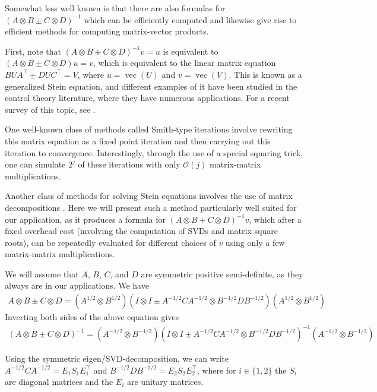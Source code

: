 \documentclass[12pt]{article}
\newcommand{\ovec}{\operatorname{vec}}
\newcommand{\bigO}{\mathcal{O}}
\begin{document}
Somewhat less well known is that there are also formulas for $(A \otimes B \pm C \otimes D)^{-1}$ which can be efficiently computed and likewise give rise to efficient methods for computing matrix-vector products.

First, note that $(A \otimes B \pm C \otimes D)^{-1} v = u$ is equivalent to $(A \otimes B \pm C \otimes D) u = v$, which is equivalent to the linear matrix equation $B U A^\top \pm D U C^\top = V$, where $u = \ovec(U)$ and $v = \ovec(V)$.  This is known as a generalized Stein equation, and different examples of it have been studied in the control theory literature, where they have numerous applications.  For a recent survey of this topic, see \citet{iter_survey}.

One well-known class of methods called Smith-type iterations \citep{smith} involve rewriting this matrix equation as a fixed point iteration and then carrying out this iteration to convergence.  Interestingly, through the use of a special squaring trick, one can simulate $2^j$ of these iterations with only $\bigO(j)$ matrix-matrix multiplications. 

Another class of methods for solving Stein equations involves the use of matrix decompositions \citep[e.g.][]{stein_chu, stein_gardiner}.  Here we will present such a method particularly well suited for our application, as it produces a formula for $(A \otimes B + C \otimes D)^{-1} v$,  which after a fixed overhead cost (involving the computation of SVDs and matrix square roots), can be repeatedly evaluated for different choices of $v$ using only a few matrix-matrix multiplications.

We will assume that $A$, $B$, $C$, and $D$ are symmetric positive semi-definite, as they always are in our applications. We have
\begin{align*}
A \otimes B \pm C \otimes D = (A^{1/2} \otimes B^{1/2})(I \otimes I \pm A^{-1/2}CA^{-1/2} \otimes B^{-1/2}DB^{-1/2})(A^{1/2} \otimes B^{1/2})
\end{align*}
Inverting both sides of the above equation gives
\begin{align*}
(A \otimes B \pm C \otimes D)^{-1} = (A^{-1/2} \otimes B^{-1/2})(I \otimes I \pm A^{-1/2}CA^{-1/2} \otimes B^{-1/2}DB^{-1/2})^{-1}(A^{-1/2} \otimes B^{-1/2})
\end{align*}

Using the symmetric eigen/SVD-decomposition, we can write $A^{-1/2}CA^{-1/2} = E_1 S_1 E_1^\top$ and $B^{-1/2}DB^{-1/2} = E_2 S_2 E_2^\top$, where for $i \in \{1,2\}$ the $S_i$ are diagonal matrices and the $E_i$ are unitary matrices.
\end{document}
